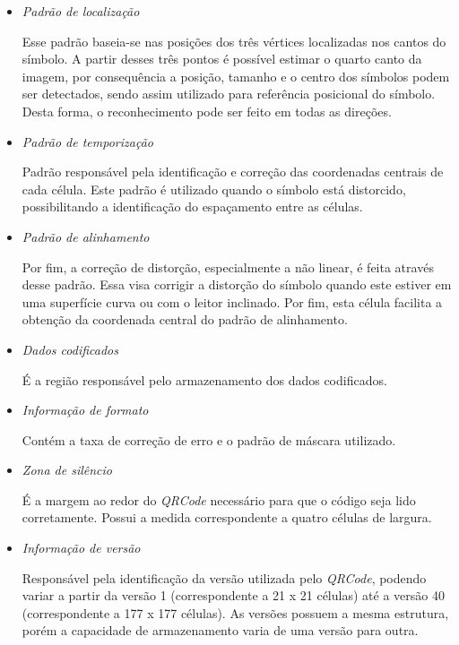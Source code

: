 	\begin{itemize}
	  \item \textit{Padrão de localização}
			  
	  	Esse padrão baseia-se nas posições dos três vértices localizadas nos cantos do símbolo. A
	  	partir desses três pontos é possível estimar o quarto canto da imagem, por consequência a
	  	posição, tamanho e o centro dos símbolos podem ser detectados, sendo assim utilizado para
	  	referência posicional do símbolo. Desta forma, o reconhecimento pode ser feito em todas as
	  	direções.
				  
		\item \textit{Padrão de temporização}
				  
		Padrão responsável pela identificação e correção das coordenadas centrais de cada célula. Este
		padrão é utilizado quando o símbolo está distorcido, possibilitando a identificação do espaçamento
		entre as células.
					
		\item \textit{Padrão de alinhamento}
					
		Por fim, a correção de distorção, especialmente a não linear, é feita através desse padrão. 
		Essa visa corrigir a distorção do símbolo quando este estiver em uma superfície curva ou 
		com o leitor inclinado.	Por fim, esta célula facilita a obtenção da coordenada central do padrão 
		de alinhamento.
		
		\item \textit{Dados codificados}
		
		É a região responsável pelo armazenamento dos dados codificados.
		
		\item \textit{Informação de formato}
		
		Contém a taxa de correção de erro e o padrão de máscara utilizado.
		
		\item \textit{Zona de silêncio}
		
		É a margem ao redor do \textit{QRCode} necessário para que o código seja lido corretamente. Possui
		a medida correspondente a quatro células de largura.
		
		\item \textit{Informação de versão}
		
		Responsável pela identificação da versão utilizada pelo \textit{QRCode}, podendo variar a partir
		da versão 1 (correspondente a 21 x 21 células) até a versão 40 (correspondente a 177 x 177
		células). As versões possuem a mesma estrutura, porém a capacidade de armazenamento varia de uma
		versão para outra.
									
	\end{itemize}
	
